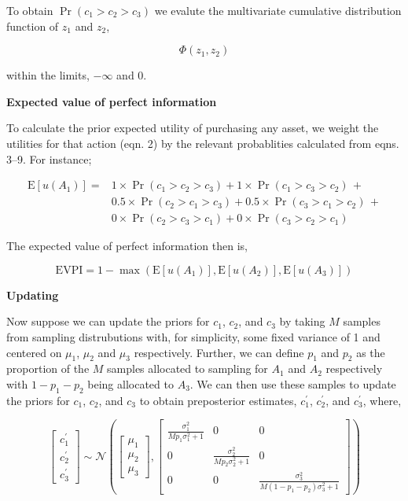 \documentclass[]{article}
\theoremstyle{definition}
\theoremstyle{definition}
\theoremstyle{remark}
\begin{document}
To obtain \(\Pr(c_1 > c_2 > c_3)\) we evalute the multivariate
cumulative distribution function of \(z_1\) and \(z_2\),

\begin{equation}
\Phi(z_1,z_2)
\label{eq:phiz}
\end{equation}

within the limits, \(-\infty\) and 0.

\textbf{Expected value of perfect information}

To calculate the prior expected utility of purchasing any asset, we
weight the utilities for that action (eqn. 2) by the relevant
probablities calculated from eqns. 3--9. For instance;

\begin{equation}
\begin{aligned}
  \mathrm{E}[u(A_1)] = & 1 \times \Pr(c_1 > c_2 > c_3) + 1 \times \Pr(c_1 > c_3 > c_2)\,+ \\
  &0.5 \times \Pr(c_2 > c_1 > c_3) + 0.5 \times \Pr(c_3 > c_1 > c_2)\,+ \\
  &0 \times \Pr(c_2 > c_3 > c_1) + 0 \times \Pr(c_3 > c_2 > c_1)
\end{aligned}
\label{eq:EuA1apen}
\end{equation}

The expected value of perfect information then is,

\begin{equation}
\mathrm{EVPI}=1-\max(\mathrm{E}[u(A_1)],\mathrm{E}[u(A_2)],\mathrm{E}[u(A_3)])
\label{eq:evpiapen2}
\end{equation}

\textbf{Updating}

Now suppose we can update the priors for \(c_1\), \(c_2\), and \(c_3\)
by taking \(M\) samples from sampling distrubutions with, for
simplicity, some fixed variance of 1 and centered on \(\mu_1\),
\(\mu_2\) and \(\mu_3\) respectively. Further, we can define \(p_1\) and
\(p_2\) as the proportion of the \(M\) samples allocated to sampling for
\(A_1\) and \(A_2\) respectively with \(1 - p_1 - p_2\) being allocated
to \(A_3\). We can then use these samples to update the priors for
\(c_1\), \(c_2\), and \(c_3\) to obtain preposterior estimates,
\(c^\prime_1\), \(c^\prime_2\), and \(c^\prime_3\), where,

\begin{equation}
\begin{bmatrix}c^\prime_1 \\ c^\prime_2 \\ c^\prime_3\end{bmatrix}\sim\mathcal{N}\left(\begin{bmatrix}\mu_1 \\ \mu_2 \\ \mu_3\end{bmatrix}, \begin{bmatrix}\frac{\sigma^2_1}{Mp_1\sigma^2_1 + 1} & 0 & 0 \\ 0 & \frac{\sigma^2_2}{Mp_2\sigma^2_2 + 1} & 0\\ 0 & 0 & \frac{\sigma^2_3}{M(1 - p_1 - p_2)\sigma^2_3 + 1} \end{bmatrix}\right)
\label{eq:jointpost}
\end{equation}
\end{document}
